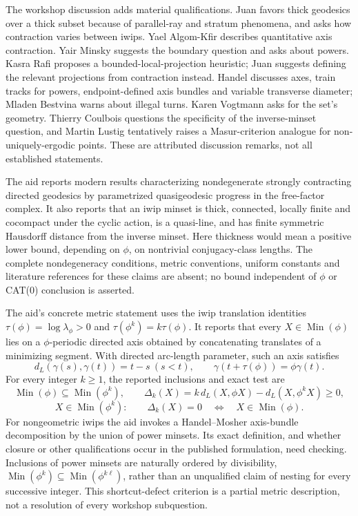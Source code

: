 \documentclass[11pt]{article}
\begin{document}
The workshop discussion adds material qualifications. Juan favors thick geodesics over a thick subset because of parallel-ray and stratum phenomena, and asks how contraction varies between iwips. Yael Algom-Kfir describes quantitative axis contraction. Yair Minsky suggests the boundary question and asks about powers. Kasra Rafi proposes a bounded-local-projection heuristic; Juan suggests defining the relevant projections from contraction instead. Handel discusses axes, train tracks for powers, endpoint-defined axis bundles and variable transverse diameter; Mladen Bestvina warns about illegal turns. Karen Vogtmann asks for the set's geometry. Thierry Coulbois questions the specificity of the inverse-minset question, and Martin Lustig tentatively raises a Masur-criterion analogue for non-uniquely-ergodic points. These are attributed discussion remarks, not all established statements.

The aid reports modern results characterizing nondegenerate strongly contracting directed geodesics by parametrized quasigeodesic progress in the free-factor complex. It also reports that an iwip minset is thick, connected, locally finite and cocompact under the cyclic action, is a quasi-line, and has finite symmetric Hausdorff distance from the inverse minset. Here thickness would mean a positive lower bound, depending on \(\phi\), on nontrivial conjugacy-class lengths. The complete nondegeneracy conditions, metric conventions, uniform constants and literature references for these claims are absent; no bound independent of \(\phi\) or CAT(0) conclusion is asserted.

The aid's concrete metric statement uses the iwip translation identities \(\tau(\phi)=\log\lambda_\phi>0\) and \(\tau(\phi^k)=k\tau(\phi)\). It reports that every \(X\in\operatorname{Min}(\phi)\) lies on a \(\phi\)-periodic directed axis obtained by concatenating translates of a minimizing segment. With directed arc-length parameter, such an axis satisfies
\[
 d_L(\gamma(s),\gamma(t))=t-s\ (s<t),\qquad
 \gamma(t+\tau(\phi))=\phi\gamma(t).
\]
For every integer \(k\geq1\), the reported inclusions and exact test are
\[
 \operatorname{Min}(\phi)\subseteq\operatorname{Min}(\phi^k),\qquad
 \Delta_k(X)=k\,d_L(X,\phi X)-d_L(X,\phi^kX)\geq0,
\]
\[
 X\in\operatorname{Min}(\phi^k):\qquad
 \Delta_k(X)=0\quad\Longleftrightarrow\quad X\in\operatorname{Min}(\phi).
\]
For nongeometric iwips the aid invokes a Handel--Mosher axis-bundle decomposition by the union of power minsets. Its exact definition, and whether closure or other qualifications occur in the published formulation, need checking. Inclusions of power minsets are naturally ordered by divisibility, \(\operatorname{Min}(\phi^k)\subseteq\operatorname{Min}(\phi^{k\ell})\), rather than an unqualified claim of nesting for every successive integer. This shortcut-defect criterion is a partial metric description, not a resolution of every workshop subquestion.
\end{document}
